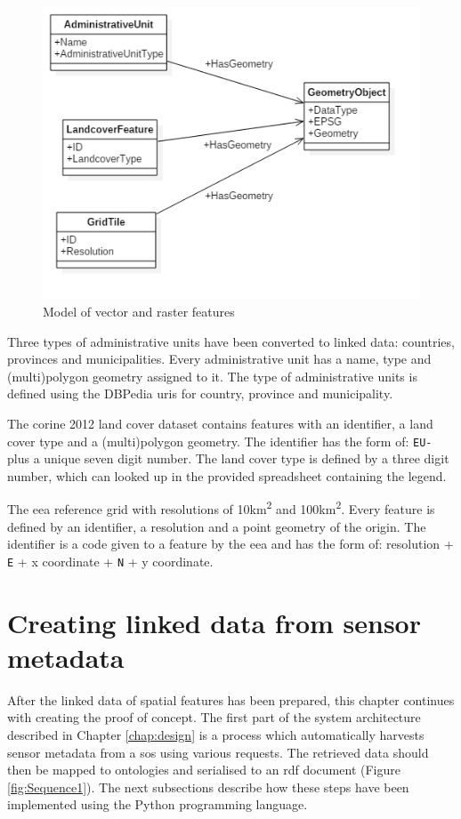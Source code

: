\begin{figure}
	\includegraphics[width=0.7\linewidth]{UML/staticdata2.PNG}
	\caption{Model of vector and raster features}
	\label{fig:Static}
\end{figure}

Three types of administrative units have been converted to linked data: countries, provinces and municipalities. Every administrative unit has a name, type and (multi)polygon geometry assigned to it. The type of administrative units is defined using the DBPedia \ac{uri}s for country, province and municipality. 

The \ac{corine} 2012 land cover dataset contains features with an identifier, a land cover type and a (multi)polygon geometry. The identifier has the form of: \texttt{EU-} plus a unique seven digit number. The land cover type is defined by a three digit number, which can looked up in the provided spreadsheet containing the legend.    

The \ac{eea} reference grid with resolutions of 10km\textsuperscript{2} and 100km\textsuperscript{2}. Every feature is defined by an identifier, a resolution and a point geometry of the origin. The identifier is a code given to a feature by the \ac{eea} and has the form of: resolution + \texttt{E} + x coordinate + \texttt{N} + y coordinate.  


\section{Creating linked data from sensor metadata}
\label{par:linkedSD}

After the linked data of spatial features has been prepared, this chapter continues with creating the proof of concept. The first part of the system architecture described in Chapter \ref{chap:design} is a process which automatically harvests sensor metadata from a \ac{sos} using various requests. The retrieved data should then be mapped to ontologies and serialised to an \ac{rdf} document (Figure \ref{fig:Sequence1}). The next subsections describe how these steps have been implemented using the Python programming language.


